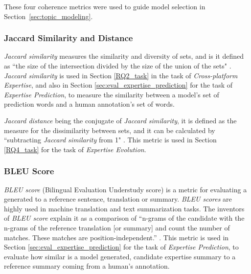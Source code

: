             These four coherence metrics were used to guide model selection in Section~\ref{sec:topic_modeling}.
        
        \subsubsection{Jaccard Similarity and Distance\label{background:jaccard}}
            \emph{Jaccard similarity} measures the similarity and diversity of sets, and is it defined as ``the size of the intersection divided by the size of the union of the sets" \cite{jaccard_wiki}. \emph{Jaccard similarity} is used in Section \ref{RQ2_task} in the task of \emph{Cross-platform Expertise}, and also in Section \ref{sec:eval_expertise_prediction} for the task of \emph{Expertise Prediction}, to measure the similarity between a model's set of prediction words and a human annotation's set of words.
            
            \emph{Jaccard distance} being the conjugate of \emph{Jaccard similarity}, it is defined as the measure for the dissimilarity between sets, and it can be calculated by ``subtracting \emph{Jaccard similarity} from 1" \cite{jaccard_wiki}. This metric is used in Section \ref{RQ4_task} for the task of \emph{Expertise Evolution}.
        
        \subsubsection{BLEU Score}
            \emph{BLEU score} (Bilingual Evaluation Understudy score) is a metric for evaluating a generated to a reference sentence, translation or summary. \emph{BLEU scores} are highly used in machine translation and text summarization tasks. The inventors of \emph{BLEU score} explain it as a comparison of ``n-grams of the candidate with the n-grams of the reference translation [or summary] and count the number of matches. These matches are position-independent.'' \cite{papineni2002bleu}. This metric is used in Section \ref{sec:eval_expertise_prediction} for the task of \emph{Expertise Prediction}, to evaluate how similar is a model generated, candidate expertise summary to a reference summary coming from a human's annotation.
        
